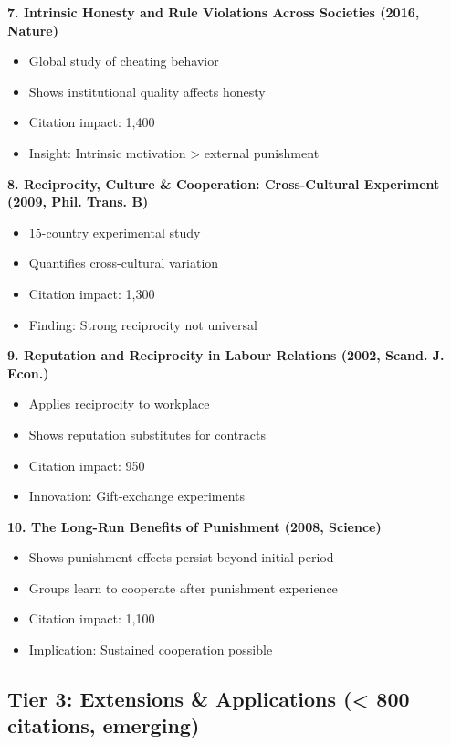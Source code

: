\documentclass[11pt]{article}
\begin{document}
\textbf{7. Intrinsic Honesty and Rule Violations Across Societies (2016, Nature)}
\begin{itemize}
    \item Global study of cheating behavior
    \item Shows institutional quality affects honesty
    \item Citation impact: 1,400
    \item Insight: Intrinsic motivation > external punishment
\end{itemize}

\textbf{8. Reciprocity, Culture \& Cooperation: Cross-Cultural Experiment (2009, Phil. Trans. B)}
\begin{itemize}
    \item 15-country experimental study
    \item Quantifies cross-cultural variation
    \item Citation impact: 1,300
    \item Finding: Strong reciprocity not universal
\end{itemize}

\textbf{9. Reputation and Reciprocity in Labour Relations (2002, Scand. J. Econ.)}
\begin{itemize}
    \item Applies reciprocity to workplace
    \item Shows reputation substitutes for contracts
    \item Citation impact: 950
    \item Innovation: Gift-exchange experiments
\end{itemize}

\textbf{10. The Long-Run Benefits of Punishment (2008, Science)}
\begin{itemize}
    \item Shows punishment effects persist beyond initial period
    \item Groups learn to cooperate after punishment experience
    \item Citation impact: 1,100
    \item Implication: Sustained cooperation possible
\end{itemize}

\subsection*{Tier 3: Extensions \& Applications (< 800 citations, emerging)}
\end{document}
